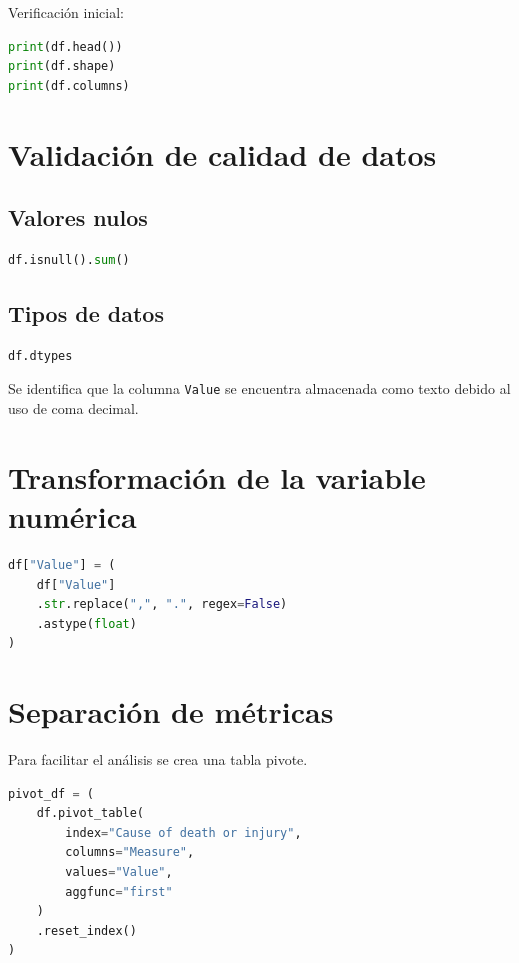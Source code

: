 \documentclass[12pt,a4paper]{article}
\begin{document}
Verificación inicial:

\begin{lstlisting}[language=Python]
print(df.head())
print(df.shape)
print(df.columns)
\end{lstlisting}

\section{Validación de calidad de datos}

\subsection{Valores nulos}

\begin{lstlisting}[language=Python]
df.isnull().sum()
\end{lstlisting}

\subsection{Tipos de datos}

\begin{lstlisting}[language=Python]
df.dtypes
\end{lstlisting}

Se identifica que la columna \texttt{Value} se encuentra almacenada como texto debido al uso de coma decimal.

\section{Transformación de la variable numérica}

\begin{lstlisting}[language=Python]
df["Value"] = (
    df["Value"]
    .str.replace(",", ".", regex=False)
    .astype(float)
)
\end{lstlisting}

\section{Separación de métricas}

Para facilitar el análisis se crea una tabla pivote.

\begin{lstlisting}[language=Python]
pivot_df = (
    df.pivot_table(
        index="Cause of death or injury",
        columns="Measure",
        values="Value",
        aggfunc="first"
    )
    .reset_index()
)
\end{lstlisting}
\end{document}
